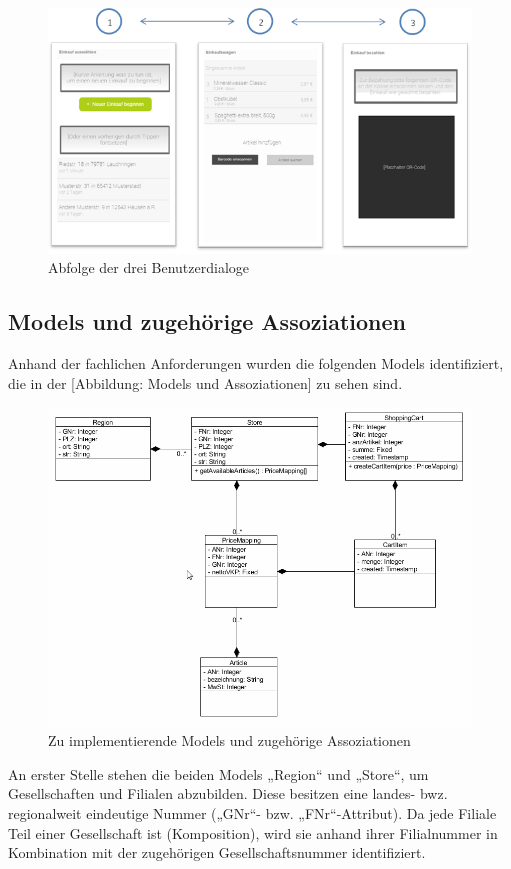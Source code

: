 \begin{figure}[H]
\includegraphics[width=\linewidth]{res/views.png}
\caption{Abfolge der drei Benutzerdialoge}
\end{figure}

\subsection{Models und zugehörige Assoziationen}
Anhand der fachlichen Anforderungen wurden die folgenden Models identifiziert, die in der [Abbildung: Models und Assoziationen] zu sehen sind.

\begin{figure}[H]
\includegraphics[width=\linewidth]{res/models.png}
\caption{Zu implementierende Models und zugehörige Assoziationen}
\end{figure}

An erster Stelle stehen die beiden Models „Region“ und „Store“, um Gesellschaften und Filialen abzubilden. Diese besitzen eine landes- bwz. regionalweit eindeutige Nummer („GNr“- bzw. „FNr“-Attribut). Da jede Filiale Teil einer Gesellschaft ist (Komposition), wird sie anhand ihrer Filialnummer in Kombination mit der zugehörigen Gesellschaftsnummer identifiziert.

